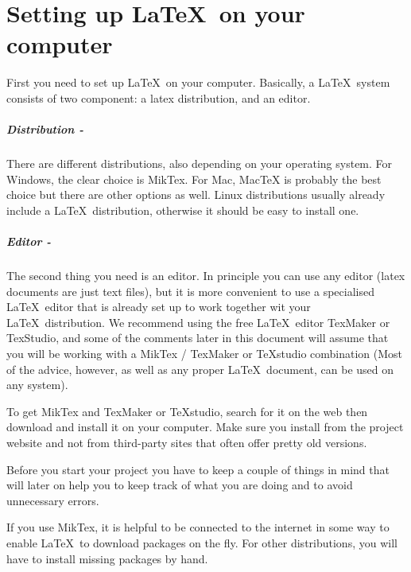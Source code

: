 \documentclass[]{tufte-book} %
\begin{document}
\chapter{Setting up \LaTeX\ on your computer}

First you need to set up \LaTeX\ on your computer. Basically, a \LaTeX\ system consists of two component: a latex distribution, and an editor.

\paragraph{Distribution -}There are different distributions, also depending on your operating system. For Windows, the clear choice is MikTex. For Mac, MacTeX is probably the best choice but there are other options as well. Linux distributions usually already include a \LaTeX\ distribution, otherwise it should be easy to install one. 

\paragraph{Editor -}The second thing you need is an editor. In principle you can use any editor (latex documents are just text files), but it is more convenient to use a specialised \LaTeX\  editor that is already set up to work together wit your \LaTeX\ distribution.  We recommend using the free \LaTeX\ editor TexMaker or TexStudio, and some of the comments later in this document will assume that you will be working with a MikTex / TexMaker or TeXstudio combination (Most of the advice, however, as well as any proper \LaTeX\ document, can be used on any system).

To get MikTex and TexMaker or TeXstudio, search for it on the web then download and install it on your computer. Make sure you install from the project website and not from third-party sites that often offer pretty old versions. 
  
Before you start your project you have to keep a couple of things in mind that will later on help you to keep track of what you are doing and to avoid unnecessary errors.
 
If you use MikTex, it is helpful to be connected to the internet in some way to enable \LaTeX\ to download packages on the fly. For other distributions, you will have to install missing packages by hand. 
\end{document}
